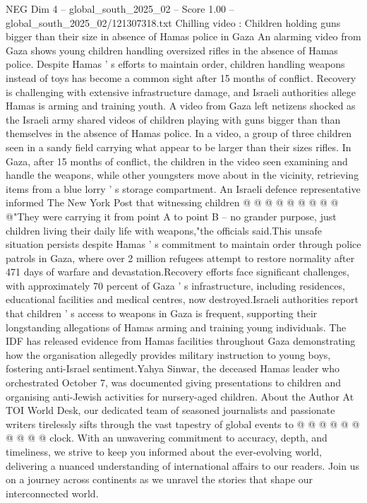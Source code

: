 \begin{textsample}{NEG Dim 4 – global\_south\_2025\_02 – Score 1.00 – global\_south\_2025\_02/121307318.txt}  \label{ex:f4_neg_437}
Chilling video : Children holding guns bigger than their size in absence of Hamas police in Gaza An alarming video from Gaza shows young children handling oversized rifles in the absence of Hamas police.
Despite Hamas ' s efforts to maintain order, children handling weapons instead of toys has become a common sight after 15 months of conflict.
Recovery is challenging with extensive infrastructure damage, and Israeli authorities allege Hamas is arming and training youth.
A video from Gaza left netizens shocked as the Israeli army shared videos of children playing with guns bigger than than themselves in the absence of Hamas police.
In a video, a group of three children seen in a sandy field carrying what appear to be larger than their sizes rifles.
In Gaza, after 15 months of conflict, the children in the video seen examining and handle the weapons, while other youngsters move about in the vicinity, retrieving items from a blue lorry ' s storage compartment.
An Israeli defence representative informed The New York Post that witnessing children @ @ @ @ @ @ @ @ @ @"They were carrying it from point A to point B -- no grander purpose, just children living their daily life with weapons,"the officials said.This unsafe situation persists despite Hamas ' s commitment to maintain order through police patrols in Gaza, where over 2 million refugees attempt to restore normality after 471 days of warfare and devastation.Recovery efforts face significant challenges, with approximately 70 percent of Gaza ' s infrastructure, including residences, educational facilities and medical centres, now destroyed.Israeli authorities report that children ' s access to weapons in Gaza is frequent, supporting their longstanding allegations of Hamas arming and training young individuals.
The IDF has released evidence from Hamas facilities throughout Gaza demonstrating how the organisation allegedly provides military instruction to young boys, fostering anti-Israel sentiment.Yahya Sinwar, the deceased Hamas leader who orchestrated October 7, was documented giving presentations to children and organising anti-Jewish activities for nursery-aged children.
About the Author At TOI World Desk, our dedicated team of seasoned journalists and passionate writers tirelessly sifts through the vast tapestry of global events to @ @ @ @ @ @ @ @ @ @ clock.
With an unwavering commitment to accuracy, depth, and timeliness, we strive to keep you informed about the ever-evolving world, delivering a nuanced understanding of international affairs to our readers.
Join us on a journey across continents as we unravel the stories that shape our interconnected world.

\end{textsample}
